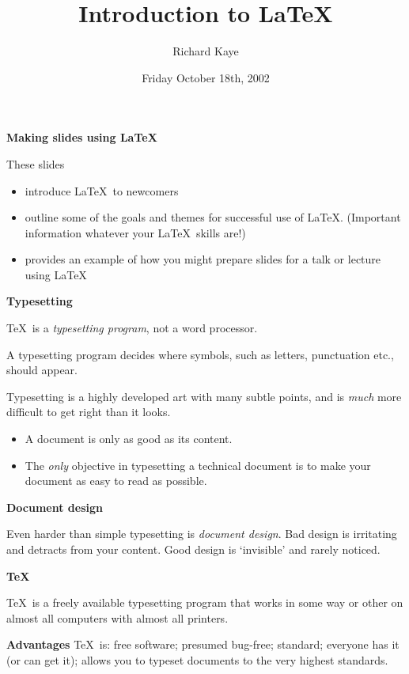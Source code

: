 \documentclass[a4paper,landscape]{slides}
\begin{document}
\title{Introduction to \LaTeX}
\author{Richard Kaye}
\date{Friday October 18th, 2002}
\maketitle

\newpage

\textbf{Making slides using \LaTeX}

These slides 
\begin{itemize}
\item introduce \LaTeX\ to newcomers
\item outline some of the goals and themes
for successful use of \LaTeX.  (Important 
information whatever your \LaTeX\ skills are!)
\item provides an example of how you might prepare
slides for a talk or lecture using \LaTeX
\end{itemize}

\newpage

\textbf{Typesetting} 

\TeX\ is a \textit{typesetting program}, not a word processor.

A typesetting program decides where symbols, such as 
letters, punctuation etc., should appear.  

Typesetting is a highly developed art with many subtle points, 
and is \textit{much} more difficult to get right than it looks.  

\begin{itemize}\bf
\item A document is only as good as its content.
\item The \textit{only} objective in typesetting a
technical document is to make your document as easy to read as 
possible.
\end{itemize}

\newpage

\textbf{Document design}

Even harder than simple typesetting is \textit{document design}.
Bad design is irritating and detracts from your content.
Good design is `invisible' and rarely noticed.

\newpage

\textbf{\TeX}

\TeX\ is a freely available typesetting program that 
works in some way or other on almost all computers
with almost all printers.

\textbf{Advantages} \TeX\ is:
 free software; presumed bug-free;
 standard; everyone has it (or can get it);
 allows you to typeset documents to the 
 very highest standards.
\end{document}

